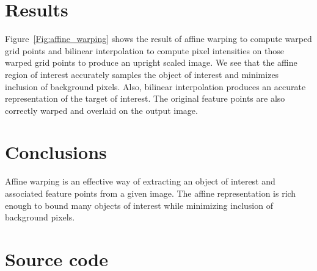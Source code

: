 \section{Results}
Figure~\ref{Fig:affine_warping} shows the result of affine warping to compute warped grid points and bilinear interpolation to compute pixel intensities on those warped grid points to produce an upright scaled image.  We see that the affine region of interest accurately samples the object of interest and minimizes inclusion of background pixels.  Also, bilinear interpolation produces an accurate representation of the target of interest.  The original feature points are also correctly warped and overlaid on the output image.

\section{Conclusions}
Affine warping is an effective way of extracting an object of interest and associated feature points from a given image.  The affine representation is rich enough to bound many objects of interest while minimizing inclusion of background pixels.




\newpage
\appendix
\section{Source code}
\label{Sec:sourceCode}
\scriptsize

